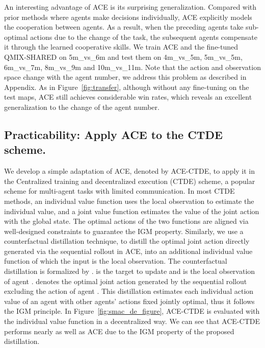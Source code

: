 \documentclass[letterpaper]{article} \usepackage{aaai23}  \usepackage{times}  \usepackage{helvet}  \usepackage{courier}  \usepackage[hyphens]{url}  \usepackage{graphicx} \urlstyle{rm} \def\UrlFont{\rm}  \usepackage{natbib}  \usepackage{caption} \frenchspacing  \setlength{\pdfpagewidth}{8.5in} \setlength{\pdfpageheight}{11in} \usepackage{algorithm}
\begin{document}
An interesting advantage of ACE is its surprising generalization. Compared with prior methods where agents make decisions individually, ACE explicitly models the cooperation between agents. As a result, when the preceding agents take sub-optimal actions due to the change of the task, the subsequent agents compensate it through the learned cooperative skills. 
We train ACE and the fine-tuned QMIX-SHARED on 5m\_vs\_6m and test them on 4m\_vs\_5m, 5m\_vs\_5m, 6m\_vs\_7m, 8m\_vs\_9m and 10m\_vs\_11m. 
Note that the action and observation space change with the agent number, we address this problem as described in Appendix.
As in Figure~\ref{fig:transfer}, although without any fine-tuning on the test maps, ACE still achieves considerable win rates, which reveals an excellent generalization to the change of the agent number. 

\vspace{-1ex}
\subsection{\textbf{Practicability:} Apply ACE to the CTDE scheme.}
\vspace{-1ex}
We develop a simple adaptation of ACE, denoted by ACE-CTDE, to apply it in the Centralized training and decentralized execution (CTDE) scheme, a popular scheme for multi-agent tasks with limited communication. In most CTDE methods, an individual value function uses the local observation to estimate the individual value, and a joint value function estimates the value of the joint action with the global state. The optimal actions of the two functions are aligned via well-designed constraints to guarantee the IGM property.
Similarly, we use a counterfactual distillation technique, to distill the optimal joint action directly generated via the sequential rollout in ACE, into an additional individual value function  of which the input is the local observation. The counterfactual distillation is formalized by .
 is the target to update  and  is the local observation of agent .  denotes the optimal joint action generated by the sequential rollout excluding the action of agent . This distillation estimates each individual action value of an agent with other agents' actions fixed jointly optimal, thus it follows the IGM principle. 
In Figure~\ref{fig:smac_de_figure}, ACE-CTDE is evaluated with the individual value function  in a decentralized way. We can see that ACE-CTDE performs nearly as well as ACE due to the IGM property of the proposed distillation.
\end{document}
